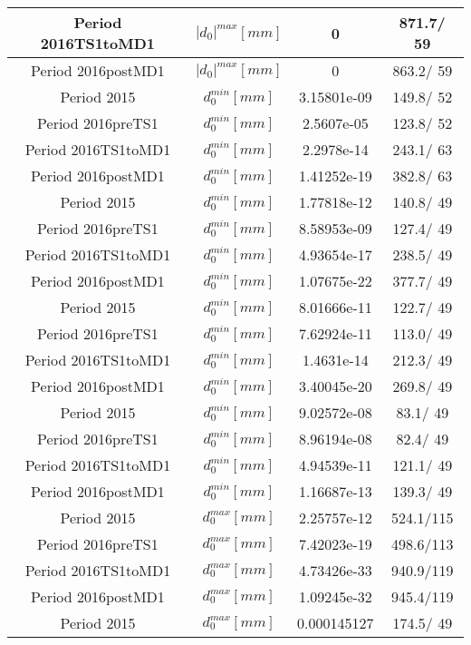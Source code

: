 \documentclass{article}
\begin{document}
\begin{longtable}{c|c|c|c}
\hline
 Period 2016TS1toMD1 & $|d_{0}|^{max} [mm]$ & 0 & 871.7/ 59\\
\hline
 Period 2016postMD1 & $|d_{0}|^{max} [mm]$ & 0 & 863.2/ 59\\
\hline
 Period 2015 & $d_{0}^{min} [mm]$ & 3.15801e-09 & 149.8/ 52\\
\hline
 Period 2016preTS1 & $d_{0}^{min} [mm]$ & 2.5607e-05 & 123.8/ 52\\
\hline
 Period 2016TS1toMD1 & $d_{0}^{min} [mm]$ & 2.2978e-14 & 243.1/ 63\\
\hline
 Period 2016postMD1 & $d_{0}^{min} [mm]$ & 1.41252e-19 & 382.8/ 63\\
\hline
 Period 2015 & $d_{0}^{min} [mm]$ & 1.77818e-12 & 140.8/ 49\\
\hline
 Period 2016preTS1 & $d_{0}^{min} [mm]$ & 8.58953e-09 & 127.4/ 49\\
\hline
 Period 2016TS1toMD1 & $d_{0}^{min} [mm]$ & 4.93654e-17 & 238.5/ 49\\
\hline
 Period 2016postMD1 & $d_{0}^{min} [mm]$ & 1.07675e-22 & 377.7/ 49\\
\hline
 Period 2015 & $d_{0}^{min} [mm]$ & 8.01666e-11 & 122.7/ 49\\
\hline
 Period 2016preTS1 & $d_{0}^{min} [mm]$ & 7.62924e-11 & 113.0/ 49\\
\hline
 Period 2016TS1toMD1 & $d_{0}^{min} [mm]$ & 1.4631e-14 & 212.3/ 49\\
\hline
 Period 2016postMD1 & $d_{0}^{min} [mm]$ & 3.40045e-20 & 269.8/ 49\\
\hline
 Period 2015 & $d_{0}^{min} [mm]$ & 9.02572e-08 &  83.1/ 49\\
\hline
 Period 2016preTS1 & $d_{0}^{min} [mm]$ & 8.96194e-08 &  82.4/ 49\\
\hline
 Period 2016TS1toMD1 & $d_{0}^{min} [mm]$ & 4.94539e-11 & 121.1/ 49\\
\hline
 Period 2016postMD1 & $d_{0}^{min} [mm]$ & 1.16687e-13 & 139.3/ 49\\
\hline
 Period 2015 & $d_{0}^{max} [mm]$ & 2.25757e-12 & 524.1/115\\
\hline
 Period 2016preTS1 & $d_{0}^{max} [mm]$ & 7.42023e-19 & 498.6/113\\
\hline
 Period 2016TS1toMD1 & $d_{0}^{max} [mm]$ & 4.73426e-33 & 940.9/119\\
\hline
 Period 2016postMD1 & $d_{0}^{max} [mm]$ & 1.09245e-32 & 945.4/119\\
\hline
 Period 2015 & $d_{0}^{max} [mm]$ & 0.000145127 & 174.5/ 49\\

\end{longtable}
\end{document}
